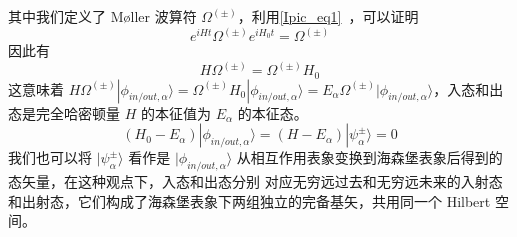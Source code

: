 其中我们定义了 Møller 波算符 $\Omega^{(\pm)}$，利用\autoref{Ipic_eq1}~，可以证明
\begin{equation}
e^{iHt}\Omega^{(\pm)} e^{iH_0 t}=\Omega^{(\pm)}
\end{equation}
因此有
\begin{equation}
H\Omega^{(\pm)}=\Omega^{(\pm)}H_0
\end{equation}
这意味着 $H\Omega^{(\pm)}|\phi_{in/out,\alpha}\rangle=\Omega^{(\pm)}H_0|\phi_{in/out,\alpha}\rangle =E_\alpha \Omega^{(\pm)}|\phi_{in/out,\alpha}\rangle$，入态和出态是完全哈密顿量 $H$ 的本征值为 $E_\alpha$ 的本征态。
\begin{equation}
(H_0-E_\alpha)|\phi_{in/out,\alpha}\rangle=(H-E_\alpha)|\psi_\alpha^{\pm}\rangle=0
\end{equation}
我们也可以将 $|\psi_\alpha^{\pm}\rangle$ 看作是 $|\phi_{in/out,\alpha}\rangle$ 从相互作用表象变换到海森堡表象后得到的态矢量，在这种观点下，入态和出态分别 对应无穷远过去和无穷远未来的入射态和出射态，它们构成了海森堡表象下两组独立的完备基矢，共用同一个 Hilbert 空间。
